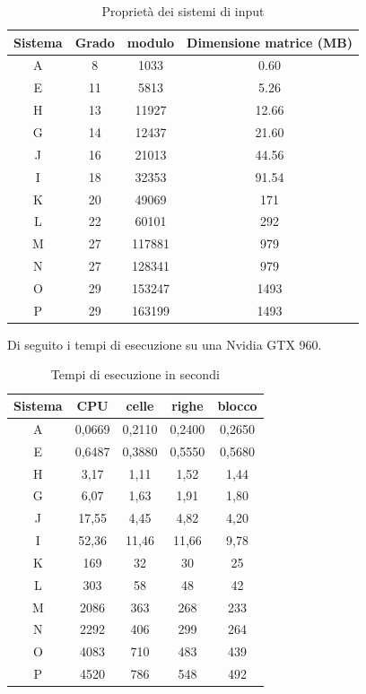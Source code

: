 \documentclass{article}
\begin{document}
\begin{table}[h!]
\centering
 \begin{tabular}{|c | c | c | c |} 
 \hline
 Sistema & Grado & modulo & Dimensione matrice (MB)\\
 \hline
A & 8  & 1033   & 0.60\\
E & 11 & 5813   & 5.26\\	
H & 13 & 11927  & 12.66\\
G & 14 & 12437  & 21.60 \\
J & 16 & 21013  & 44.56\\
I & 18 & 32353  & 91.54\\
K & 20 & 49069  & 171\\
L & 22 & 60101  & 292\\
M & 27 & 117881 & 979\\
N & 27 & 128341 & 979\\
O & 29 & 153247 & 1493\\
P & 29 & 163199 & 1493\\
 \hline

\end{tabular}
\caption{Proprietà dei sistemi di input}
\label{table:2}
\end{table}
Di seguito i tempi di esecuzione su una Nvidia GTX 960.
\begin{table}[h!]
\centering
 \begin{tabular}{|c | c | c | c | c|} 
 \hline
 Sistema & CPU & celle & righe & blocco\\
 \hline
A & 0,0669    & 0,2110   & 0,2400   & 0,2650\\
E & 0,6487    & 0,3880   & 0,5550   & 0,5680\\	
H & 3,17      & 1,11     & 1,52     & 1,44\\
G & 6,07      & 1,63     & 1,91     & 1,80\\
J & 17,55     & 4,45     & 4,82     & 4,20\\
I & 52,36     & 11,46    & 11,66    & 9,78\\
K & 169       & 32       & 30       & 25\\
L & 303       & 58       & 48       & 42\\
M & 2086      & 363      & 268      & 233\\
N & 2292      & 406      & 299      & 264\\
O & 4083      & 710      & 483      & 439\\
P & 4520      & 786      & 548      & 492\\
 \hline

\end{tabular}
\caption{Tempi di esecuzione in secondi}
\label{table:1}
\end{table}
\end{document}
